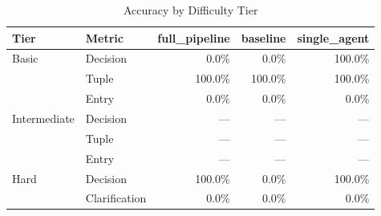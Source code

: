 \begin{table}[htbp]
\centering
\caption{Accuracy by Difficulty Tier}
\label{tab:tier-breakdown}
\begin{tabular}{ll rrr}
\toprule
Tier & Metric & full\_pipeline & baseline & single\_agent \\
\midrule
  Basic & Decision & 0.0\% & 0.0\% & 100.0\% \\
   & Tuple & 100.0\% & 100.0\% & 100.0\% \\
   & Entry & 0.0\% & 0.0\% & 0.0\% \\
  \midrule
  Intermediate & Decision & --- & --- & --- \\
   & Tuple & --- & --- & --- \\
   & Entry & --- & --- & --- \\
  \midrule
  Hard & Decision & 100.0\% & 0.0\% & 100.0\% \\
   & Clarification & 0.0\% & 0.0\% & 0.0\% \\
\bottomrule
\end{tabular}
\end{table}
